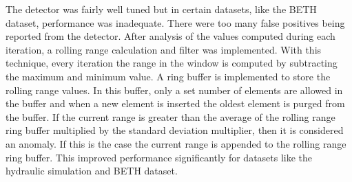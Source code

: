 The detector was fairly well tuned but in certain datasets, like the BETH dataset, performance was inadequate. There were too many false positives being reported from the detector. After analysis of the values computed during each iteration, %
a rolling range calculation and filter was implemented. With this technique, every iteration the range in the window is computed by subtracting the maximum and minimum value. A ring buffer is implemented to store the rolling range values. In this buffer, only a set number of elements are allowed in the buffer and when a new element is inserted the oldest element is purged from the buffer. If the current range is greater than the average of the rolling range ring buffer multiplied by the standard deviation multiplier, then it is considered an anomaly. If this is the case the current range is appended to the rolling range ring buffer. This improved performance significantly for datasets like the hydraulic simulation and BETH dataset.